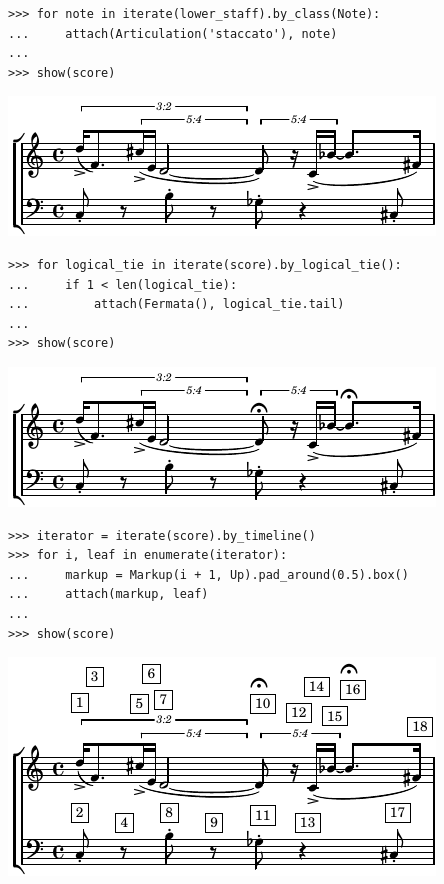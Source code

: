 \documentclass{article}
\begin{document}
\begin{lstlisting}
>>> for note in iterate(lower_staff).by_class(Note):
...     attach(Articulation('staccato'), note)
...
>>> show(score)
\end{lstlisting}
\includegraphics{assets/lilypond-b7a01ad584c3c470c0bbff20fbc76741.pdf}

\begin{lstlisting}
>>> for logical_tie in iterate(score).by_logical_tie():
...     if 1 < len(logical_tie):
...         attach(Fermata(), logical_tie.tail)
...
>>> show(score)
\end{lstlisting}
\includegraphics{assets/lilypond-b5f9325282fd0c528bd1874a4b8a6987.pdf}

\begin{lstlisting}
>>> iterator = iterate(score).by_timeline()
>>> for i, leaf in enumerate(iterator):
...     markup = Markup(i + 1, Up).pad_around(0.5).box()
...     attach(markup, leaf)
...
>>> show(score)
\end{lstlisting}
\includegraphics{assets/lilypond-cab0e364ff6f8132f4f5ea06b1e3a947.pdf}
\end{document}
